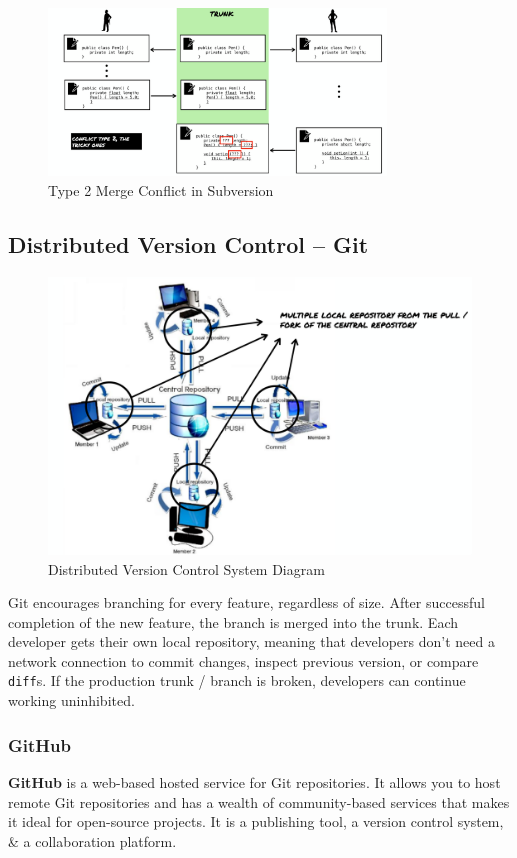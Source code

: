 \documentclass[a4paper,11pt]{article}
\begin{document}
\begin{figure}[H]
    \centering
    \includegraphics[width=0.8\textwidth]{images/svn_conflict2.png}
    \caption{Type 2 Merge Conflict in Subversion}
\end{figure}

\subsection{Distributed Version Control -- Git}
\begin{figure}[H]
    \centering
    \includegraphics[width=\textwidth]{images/distributed_vcs.png}
    \caption{Distributed Version Control System Diagram}
\end{figure}

Git encourages branching for every feature, regardless of size.
After successful completion of the new feature, the branch is merged into the trunk.
Each developer gets their own local repository, meaning that developers don't need a network connection 
to commit changes, inspect previous version, or compare \verb|diff|s.
If the production trunk / branch is broken, developers can continue working uninhibited.

\subsubsection{GitHub}
\textbf{GitHub} is a web-based hosted service for Git repositories.
It allows you to host remote Git repositories and has a wealth of community-based services that makes it ideal for open-source projects.
It is a publishing tool, a version control system, \& a collaboration platform.
\end{document}
